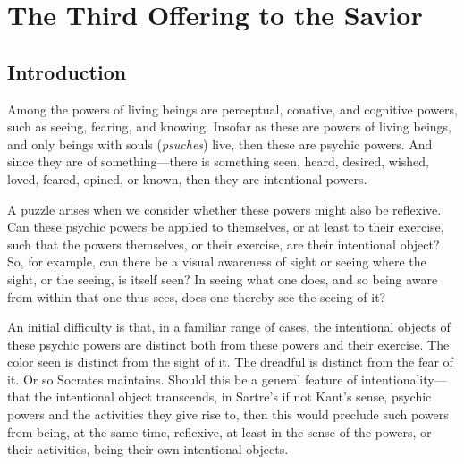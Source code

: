 \chapter{The Third Offering to the Savior} %
\label{cha:offering}

\section{Introduction} %
\label{sec:aintroduction}

Among the powers of living beings are perceptual, conative, and cognitive powers, such as seeing, fearing, and knowing. Insofar as these are powers of living beings, and only beings with souls (\emph{psuches}) live, then these are psychic powers. And since they are of something—there is something seen, heard, desired, wished, loved, feared, opined, or known, then they are intentional powers.

A puzzle arises when we consider whether these powers might also be reflexive. Can these psychic powers be applied to themselves, or at least to their exercise, such that the powers themselves, or their exercise, are their intentional object? So, for example, can there be a visual awareness of sight or seeing where the sight, or the seeing, is itself seen? In seeing what one does, and so being aware from within that one thus sees, does one thereby see the seeing of it? 


An initial difficulty is that, in a familiar range of cases, the intentional objects of these psychic powers are distinct both from these powers and their exercise. The color seen is distinct from the sight of it. The dreadful is distinct from the fear of it. Or so Socrates maintains. Should this be a general feature of intentionality—that the intentional object transcends, in Sartre's if not Kant's sense, psychic powers and the activities they give rise to, then this would preclude such powers from being, at the same time, reflexive, at least in the sense of the powers, or their activities, being their own intentional objects.

